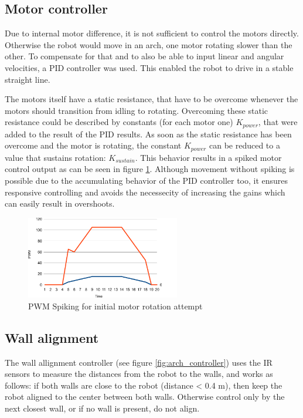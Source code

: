 \subsection{Motor controller}

Due to internal motor difference, it is not sufficient to control the motors directly.
Otherwise the robot would move in an arch, one motor rotating slower than the other.
To compensate for that and to also be able to input linear and angular velocities, a PID controller was used. 
This enabled the robot to drive in a stable straight line.

The motors itself have a static resistance, that have to be overcome whenever the motors should transition from idling to rotating.
Overcoming these static resistance could be described by constants (for each motor one) $K_{power}$, that were added to the result of the PID results.
As soon as the static resistance has been overcome and the motor is rotating, the constant $K_{power}$ can be reduced to a value that sustains rotation: $K_{sustain}$.
This behavior results in a spiked motor control output as can be seen in figure \ref{fig:pwm_spiker}.
Although movement without spiking is possible due to the accumulating behavior of the PID controller too, it ensures responsive controlling and avoids the necessecity of increasing the gains which can easily result in overshoots.

\begin{figure}[h]
\begin{center}
\includegraphics[width=0.6\textwidth]{figures/pwm_spike.pdf}
\end{center}
\caption{PWM Spiking for initial motor rotation attempt}
\label{fig:pwm_spiker}
\end{figure}

\subsection{Wall alignment}

The wall allignment controller (see figure \ref{fig:arch_controller}) uses the IR sensors to measure the distances from the robot to the walls, and works as follows: if both walls are close to the robot (distance < 0.4 m), then keep the robot aligned to the center between both walls.
Otherwise control only by the next closest wall, or if no wall is present, do not align.